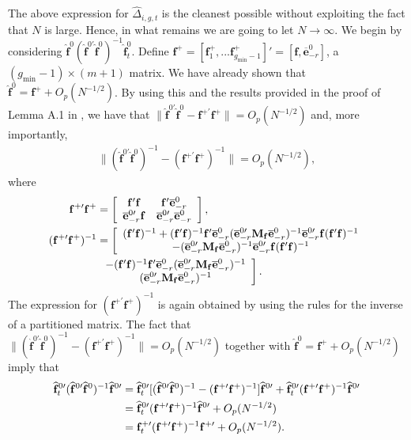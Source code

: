\documentclass[12pt,fleqn]{article}
\def\*#1{\mathbf{#1}}
\begin{document}
The above expression for $\widehat \Delta_{i,g,t}$ is the cleanest possible without exploiting the fact that $N$ is large. Hence, in what remains we are going to let $N\to\infty$. We begin by considering $\widehat{\*f}^{0} (\widehat{\*f}^{0\prime}\widehat{\*f}^0)^{-1}\widehat{\*f}_t^0$. Define $\*f^+ = [\*f_1^+,... \*f_{g_{\min}-1}^+]' = [\*f, \overline{\*e}_{-r}^{0}]$, a $(g_{\min}-1)\times (m+1)$ matrix. We have already shown that $\widehat{\*{f}}^0 = \*f^+ +  O_p(N^{-1/2})$. By using this and the results provided in the proof of Lemma A.1 in \citet{westerlund2019cce}, we have that $\|\widehat{\*f}^{0\prime}\widehat{\*f}^0 - \*f^{+\prime}\*f^+\|= O_p(N^{-1/2})$ and, more importantly,
\begin{align}
\|(\widehat{\*f}^{0\prime}\widehat{\*f}^0 )^{-1} - (\*f^{+\prime}\*f^+)^{-1}\| = O_p(N^{-1/2}),
\end{align}
where
\begin{align}
\*f^{+\prime}\*f^+ &= \left[\begin{array}{cc} \*f'\*f & \*f'\overline{\*e}_{-r}^0 \\ \overline{\*e}_{-r}^{0\prime}\*f  & \overline{\*e}_{-r}^{0\prime}\overline{\*e}_{-r}^0 \end{array}\right] ,\\
(\*f^{+\prime}\*f^+)^{-1} &= \left[\begin{array}{c} (\*f'\*f)^{-1} + (\*f'\*f)^{-1}\*f'\overline{\*e}_{-r}^0(\overline{\*e}_{-r}^{0\prime}\*M_{\*f}\overline{\*e}_{-r}^0)^{-1}\overline{\*e}_{-r}^{0\prime} \*f(\*f'\*f)^{-1}  \\
-(\overline{\*e}_{-r}^{0\prime}\*M_{\*f}\overline{\*e}_{-r}^0)^{-1}\overline{\*e}_{-r}^{0\prime}\*f (\*f'\*f)^{-1} \end{array}\right. \notag\\
& \left. \begin{array}{c}  -(\*f'\*f)^{-1}\*f'\overline{\*e}_{-r}^0(\overline{\*e}_{-r}^{0\prime}\*M_{\*f}\overline{\*e}_{-r}^0)^{-1} \\
 (\overline{\*e}_{-r}^{0\prime}\*M_{\*f}\overline{\*e}_{-r}^0)^{-1} \end{array}\right].
\end{align}
The expression for $(\*f^{+\prime}\*f^+)^{-1}$ is again obtained by using the rules for the inverse of a partitioned matrix. The fact that $\|(\widehat{\*f}^{0\prime}\widehat{\*f}^0 )^{-1} - (\*f^{+\prime}\*f^+)^{-1}\| = O_p(N^{-1/2})$ together with $\widehat{\*{f}}^0 = \*f^+ +  O_p(N^{-1/2})$ imply that
\begin{align}
\widehat{\*f}_t^{0\prime}(\widehat{\*f}^{0\prime}\widehat{\*f}^0)^{-1}\widehat{\*f}^{0\prime} & =  \widehat{\*f}_t^{0\prime}[(\widehat{\*f}^{0\prime}\widehat{\*f}^0)^{-1} - (\*f^{+\prime}\*f^+)^{-1} ]\widehat{\*f}^{0\prime} + \widehat{\*f}_t^{0\prime}(\*f^{+\prime}\*f^+)^{-1}\widehat{\*f}^{0\prime} \notag\\
& = \widehat{\*f}_t^{0\prime}(\*f^{+\prime}\*f^+)^{-1}\widehat{\*f}^{0\prime} + O_p(N^{-1/2})\notag\\
& = \*f_t^{+\prime}(\*f^{+\prime}\*f^+)^{-1}\*f^{+\prime} + O_p(N^{-1/2}).
\end{align}
\end{document}
